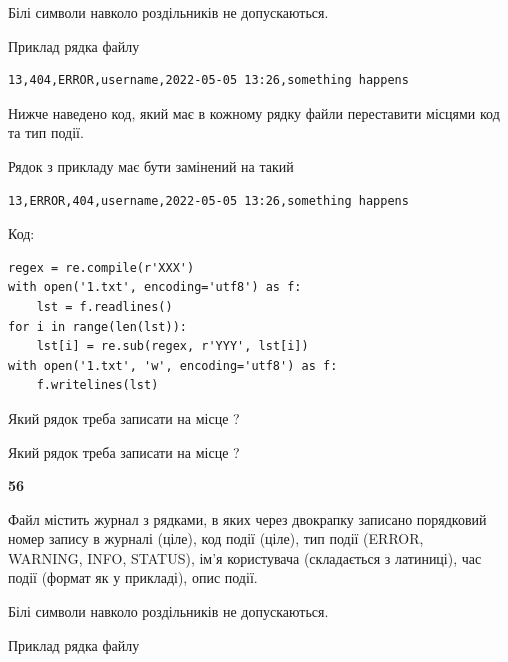 Білі символи навколо роздільників не допускаються.

Приклад рядка файлу



\begin{verbatim}
13,404,ERROR,username,2022-05-05 13:26,something happens
\end{verbatim}


Нижче наведено код, який має в кожному рядку файли переставити місцями код та тип події.

Рядок з прикладу має бути замінений на такий



\begin{verbatim}
13,ERROR,404,username,2022-05-05 13:26,something happens
\end{verbatim}




Код:



\begin{verbatim}
regex = re.compile(r'XXX')
with open('1.txt', encoding='utf8') as f:
    lst = f.readlines()
for i in range(len(lst)):
    lst[i] = re.sub(regex, r'YYY', lst[i])
with open('1.txt', 'w', encoding='utf8') as f:
    f.writelines(lst)
\end{verbatim}







Який рядок треба записати на місце  ?\par
\vspace{5mm}


Який рядок треба записати на місце  ?\par


\newpage

{\begin {center}\textbf{ 56}\end {center}}\par
Файл  містить журнал з рядками, в яких через двокрапку записано поряд\-ко\-вий номер запису в журналі (ціле), код події (ціле), тип події (ERROR,\\ WARNING, INFO, STATUS), ім'я користувача (складається з латиниці), час події (фор\-мат як у прикладі), опис події.

Білі символи навколо роздільників не допускаються.

Приклад рядка файлу



